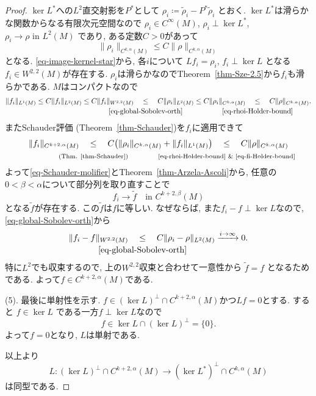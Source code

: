 \documentclass[dvipdfmx,a4paper,11pt]{article} %
\theoremstyle{definition}
\theoremstyle{remark}
\numberwithin{equation}{section}
\newcommand{\underalign}[2]{%
  \quad
  \underset{\mathclap{\raisebox{-1.6ex}{\ensuremath{\scriptstyle #1}}}}{#2}
  \quad
}
\begin{document}
\begin{proof}
$\ker L^*$への$L^2$直交射影を$P^*$として
\(
\rho_i
\coloneqq
\widetilde\rho_i-P^*\widetilde\rho_i
\)
とおく. 
$\ker L^*$は滑らかな関数からなる有限次元空間なので
\(
\rho_i\in C^\infty(M)\),
\(
\rho_i\perp\ker L^*\),
\(
\rho_i\to\rho
\text{ in }L^2(M)
\)
であり, ある定数$C>0$があって
\begin{equation}
\label{eq-rhoi-Holder-bound}
\lVert\rho_i\rVert_{C^{k,\alpha}(M)}
\leq
C\lVert\rho\rVert_{C^{k,\alpha}(M)}
\end{equation}
となる. 
\eqref{eq-image-kernel-star}から, 各$i$について
\(
Lf_i=\rho_i\),
\(
f_i\perp\ker L
\)
となる$f_i\in W^{2,2}(M)$が存在する. 
$\rho_i$は滑らかなのでTheorem~\ref{thm-Sze-2.5}から$f_i$も滑らかである. 
$M$はコンパクトなので
\begin{equation}
\label{eq-fi-Holder-bound}
\begin{aligned}
\lVert f_i\rVert_{L^1(M)}
\leq
C\lVert f_i\rVert_{L^2(M)}
\leq
C\lVert f_i\rVert_{W^{2,2}(M)}
\underalign{\eqref{eq-global-Sobolev-orth}}{\leq}
C\lVert\rho_i\rVert_{L^2(M)}
\leq
C\lVert\rho_i\rVert_{C^{k,\alpha}(M)}
\underalign{\eqref{eq-rhoi-Holder-bound}}{\leq}
C\lVert\rho\rVert_{C^{k,\alpha}(M)}.
\end{aligned}
\end{equation}
またSchauder評価 (Theorem~\ref{thm-Schauder})を$f_i$に適用できて
\begin{equation}
\label{eq-Schauder-molifier}
\lVert f_i\rVert_{C^{k+2,\alpha}(M)}
\underalign{\text{(Thm. \ref{thm-Schauder})}}{\leq}
C\bigl(
\lVert\rho_i\rVert_{C^{k,\alpha}(M)}
+
\lVert f_i\rVert_{L^1(M)}
\bigr)
\underalign{\text{\eqref{eq-rhoi-Holder-bound} \& \eqref{eq-fi-Holder-bound}}}{\leq}
C\lVert\rho\rVert_{C^{k,\alpha}(M)}
\end{equation}
よって\eqref{eq-Schauder-molifier}とTheorem~\ref{thm-Arzela-Ascoli}から, 
任意の$0<\beta<\alpha$について部分列を取り直すことで
\[
f_i\to \widetilde f
\quad\text{in }C^{k+2,\beta}(M)
\]
となる$\widetilde f$が存在する. 
この$\widetilde f$は$f$に等しい. なぜならば, また$f_i-f\perp\ker L$なので, \eqref{eq-global-Sobolev-orth}から
\[
\lVert f_i-f\rVert_{W^{2,2}(M)}
\underalign{\eqref{eq-global-Sobolev-orth}}{\leq}
C\lVert\rho_i-\rho\rVert_{L^2(M)}
\xrightarrow{i\to\infty}0.
\]
特に$L^2$でも収束するので, 上の$W^{2,2}$収束と合わせて一意性から
\(
\widetilde f=f
\)
となるためである. よって$f\in C^{k+2,\alpha}(M)$である.  

(5). 最後に単射性を示す. 
$f\in(\ker L)^\perp\cap C^{k+2,\alpha}(M)$かつ$Lf=0$とする. 
すると
\(
f\in\ker L
\)
である一方$f\perp\ker L$なので
\[
f\in\ker L\cap(\ker L)^\perp=\{0\}.
\]
よって$f=0$となり, $L$は単射である. 

以上より
\[
L\colon
(\ker L)^\perp\cap C^{k+2,\alpha}(M)
\to
(\ker L^*)^\perp\cap C^{k,\alpha}(M)
\]
は同型である. 
\end{proof}
\end{document}
